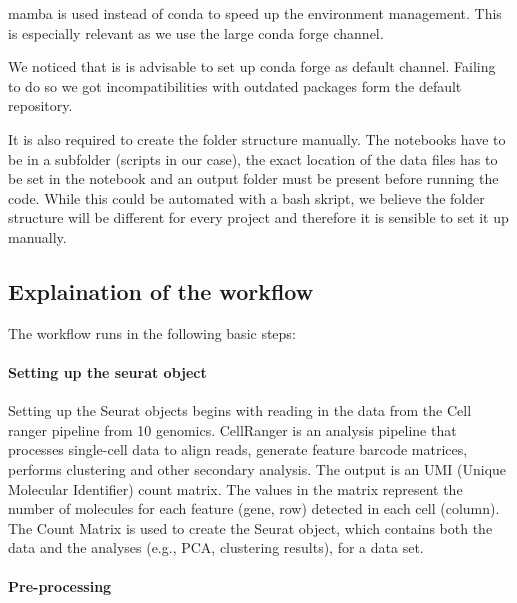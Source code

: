 \documentclass[a4paper, 10pt]{scrartcl}
\begin{document}
mamba is used instead of conda to speed up the environment management.
This is especially relevant as we use the large conda forge channel.

We noticed that is is advisable to set up conda forge as default
channel. Failing to do so we got incompatibilities with outdated
packages form the default repository.

It is also required to create the folder structure manually. The
notebooks have to be in a subfolder (scripts in our case), the exact
location of the data files has to be set in the notebook and an output
folder must be present before running the code. While this could be
automated with a bash skript, we believe the folder structure will be
different for every project and therefore it is sensible to set it up
manually.

\hypertarget{explaination-of-the-workflow}{%
\subsection{Explaination of the
workflow}\label{explaination-of-the-workflow}}

The workflow runs in the following basic steps:

\hypertarget{setting-up-the-seurat-object}{%
\paragraph{Setting up the seurat
object}\label{setting-up-the-seurat-object}}

Setting up the Seurat objects begins with reading in the data from the
Cell ranger pipeline from 10 genomics. CellRanger is an analysis
pipeline that processes single-cell data to align reads, generate
feature barcode matrices, performs clustering and other secondary
analysis. The output is an UMI (Unique Molecular Identifier) count
matrix. The values in the matrix represent the number of molecules for
each feature (gene, row) detected in each cell (column). The Count
Matrix is used to create the Seurat object, which contains both the data
and the analyses (e.g., PCA, clustering results), for a data set.

\hypertarget{pre-processing}{%
\paragraph{Pre-processing}\label{pre-processing}}
\end{document}
